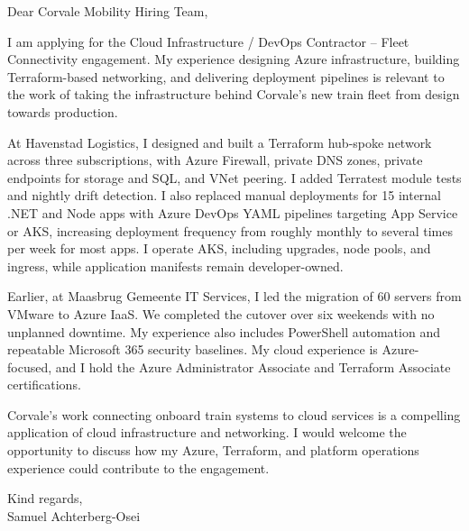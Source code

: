 \documentclass[11pt,a4paper]{article}
\begin{document}
Dear Corvale Mobility Hiring Team,

I am applying for the Cloud Infrastructure / DevOps Contractor – Fleet Connectivity engagement. My experience designing Azure infrastructure, building Terraform-based networking, and delivering deployment pipelines is relevant to the work of taking the infrastructure behind Corvale’s new train fleet from design towards production.

At Havenstad Logistics, I designed and built a Terraform hub-spoke network across three subscriptions, with Azure Firewall, private DNS zones, private endpoints for storage and SQL, and VNet peering. I added Terratest module tests and nightly drift detection. I also replaced manual deployments for 15 internal .NET and Node apps with Azure DevOps YAML pipelines targeting App Service or AKS, increasing deployment frequency from roughly monthly to several times per week for most apps. I operate AKS, including upgrades, node pools, and ingress, while application manifests remain developer-owned.

Earlier, at Maasbrug Gemeente IT Services, I led the migration of 60 servers from VMware to Azure IaaS. We completed the cutover over six weekends with no unplanned downtime. My experience also includes PowerShell automation and repeatable Microsoft 365 security baselines. My cloud experience is Azure-focused, and I hold the Azure Administrator Associate and Terraform Associate certifications.

Corvale’s work connecting onboard train systems to cloud services is a compelling application of cloud infrastructure and networking. I would welcome the opportunity to discuss how my Azure, Terraform, and platform operations experience could contribute to the engagement.

Kind regards,\\
Samuel Achterberg-Osei
\end{document}
